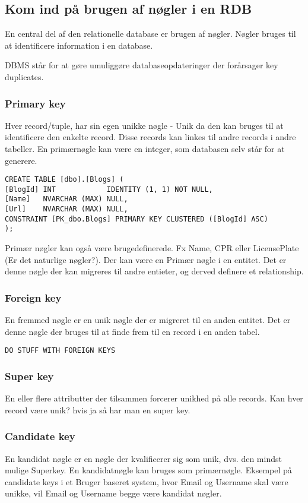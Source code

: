 \subsection{Kom ind på brugen af nøgler i en RDB}\label{sec:keys}
En central del af den relationelle database er brugen af nøgler. Nøgler bruges til at identificere information i en database.

DBMS står for at gøre umuliggøre databaseopdateringer der forårsager key duplicates.

\subsubsection{Primary key}
Hver record/tuple, har sin egen unikke nøgle - Unik da den kan bruges til at identificere den enkelte record. Disse records kan linkes til andre records i andre tabeller. En primærnøgle kan være en integer, som databasen selv står for at generere.

\begin{lstlisting}
CREATE TABLE [dbo].[Blogs] (
[BlogId] INT            IDENTITY (1, 1) NOT NULL,
[Name]   NVARCHAR (MAX) NULL,
[Url]    NVARCHAR (MAX) NULL,
CONSTRAINT [PK_dbo.Blogs] PRIMARY KEY CLUSTERED ([BlogId] ASC)
);
\end{lstlisting}

Primær nøgler kan også være brugedefinerede. Fx Name, CPR eller  LicensePlate (Er det naturlige nøgler?). Der kan være en Primær nøgle i en entitet. Det er denne nøgle der kan migreres til andre entieter, og derved definere et relationship.
\subsubsection{Foreign key}
En fremmed nøgle er en unik nøgle der er migreret til en anden entitet.
Det er denne nøgle der bruges til at finde frem til en record i en anden tabel.

\begin{lstlisting}
DO STUFF WITH FOREIGN KEYS
\end{lstlisting}

\subsubsection{Super key}
En eller flere attributter der tilsammen forcerer unikhed på alle records.
Kan hver record være unik? hvis ja så har man en super key.

\subsubsection{Candidate key}
En kandidat nøgle er en nøgle der kvalificerer sig som unik, dvs. den mindst mulige Superkey. En kandidatnøgle kan bruges som primærnøgle. Eksempel på candidate keys i et Bruger baseret system, hvor Email og Username skal være unikke, vil Email og Username begge være kandidat nøgler.

